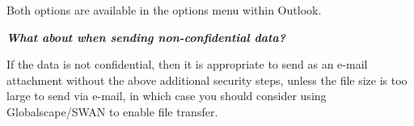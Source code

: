 \documentclass[
]{book}
\begin{document}
Both options are available in the options menu within Outlook.

\emph{\textbf{What about when sending non-confidential data?}}

If the data is not confidential, then it is appropriate to send as an e-mail attachment without the above additional security steps, unless the file size is too large to send via e-mail, in which case you should consider using Globalscape/SWAN to enable file transfer.

  
\end{document}
